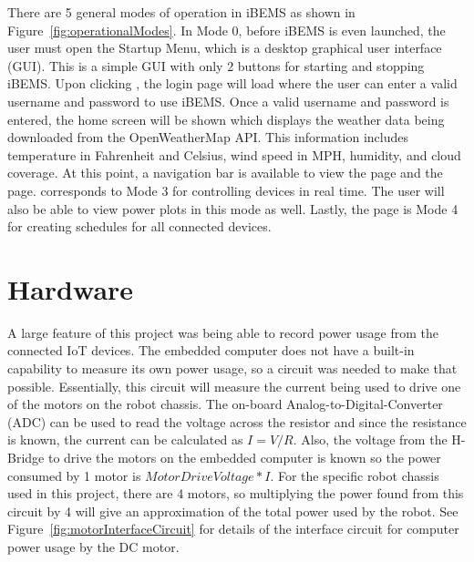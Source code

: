 There are 5 general modes of operation in iBEMS as shown in Figure~\ref{fig:operationalModes}. In Mode 0, before iBEMS is even launched, the user must open the Startup Menu, which is a desktop graphical user interface (GUI). This is a simple GUI with only 2 buttons for starting and stopping iBEMS. Upon clicking , the login page will load where the user can enter a valid username and password to use iBEMS. Once a valid username and password is entered, the home screen will be shown which displays the weather data being downloaded from the OpenWeatherMap API. This information includes temperature in Fahrenheit and Celsius, wind speed in MPH, humidity, and cloud coverage. At this point, a navigation bar is available to view the  page and the  page.  corresponds to Mode 3 for controlling devices in real time. The user will also be able to view power plots in this mode as well. Lastly, the  page is Mode 4 for creating schedules for all connected devices.

\section{Hardware}

A large feature of this project was being able to record power usage from the
connected IoT devices. The embedded computer does not have a built-in capability
to measure its own power usage, so a circuit was needed to make that
possible. Essentially, this circuit will measure the current being used to drive
one of the motors on the robot chassis. The on-board Analog-to-Digital-Converter
(ADC) can be used to read the voltage across the resistor and since the
resistance is known, the current can be calculated as $I = V/R$. Also, the
voltage from the H-Bridge to drive the motors on the embedded computer is known
so the power consumed by 1 motor is $Motor Drive Voltage * I$. For the specific
robot chassis used in this project, there are 4 motors, so multiplying the power
found from this circuit by 4 will give an approximation of the total power used
by the robot.  See Figure~\ref{fig:motorInterfaceCircuit} for details of the interface
circuit for computer power usage by the DC motor. 

